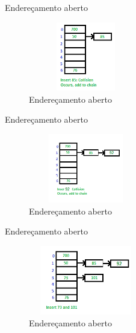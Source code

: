 \begin{frame}
	\begin{block}{Endereçamento aberto}
		\begin{figure}[!htb]
			\centering	  				
			\includegraphics[height=3cm, width = 5cm]{./pic/hashChaining14.png}
			\caption{Endereçamento aberto  \cite{GEEKS_2018}}
		\end{figure}
	\end{block}
\end{frame}

\begin{frame}
	\begin{block}{Endereçamento aberto}
		\begin{figure}[!htb]
			\centering	  				
			\includegraphics[height=3cm, width = 5cm]{./pic/hashChaining15.png}
			\caption{Endereçamento aberto  \cite{GEEKS_2018}}
		\end{figure}
	\end{block}
\end{frame}

\begin{frame}
	\begin{block}{Endereçamento aberto}
		\begin{figure}[!htb]
			\centering	  				
			\includegraphics[height=3cm, width = 5cm]{./pic/hashChaining16.png}
			\caption{Endereçamento aberto  \cite{GEEKS_2018}}
		\end{figure}
	\end{block}
\end{frame}


